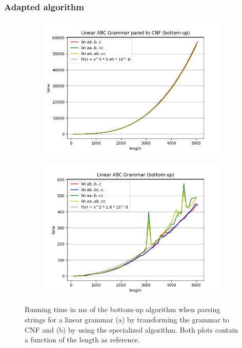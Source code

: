 \subsubsection{Adapted algorithm}
\begin{figure}[!ht]
    \centering
    \begin{subfigure}[b]{0.48\textwidth}
        \includegraphics[width=1.1\textwidth]{Resources/t_abc_cnf.jpg}
        \caption{}
        \label{fig:t_abc_cnf}
    \end{subfigure}
    \hfill
    \begin{subfigure}[b]{0.48\textwidth}
        \includegraphics[width=1.1\textwidth]{Resources/t_abc_lin.jpg}
        \caption{}
        \label{fig:t_abc_lin}
    \end{subfigure}
    \caption{Running time in ms of the bottom-up algorithm when parsing strings for a linear grammar (a) by transforming the grammar to CNF and (b) by using the specialized algorithm. Both plots contain a function of the length as reference.}
\end{figure}

